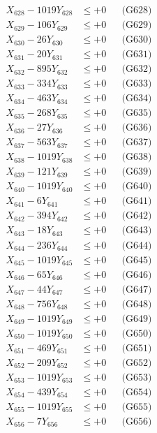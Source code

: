 \documentclass[a4paper,10pt]{article}
\begin{document}
{\begin{align}
X_{628} - 1019Y_{628} &\leq +0 && \text{(G628)} \\
X_{629} - 106Y_{629} &\leq +0 && \text{(G629)} \\
X_{630} - 26Y_{630} &\leq +0 && \text{(G630)} \\
\allowbreak
X_{631} - 20Y_{631} &\leq +0 && \text{(G631)} \\
X_{632} - 895Y_{632} &\leq +0 && \text{(G632)} \\
X_{633} - 334Y_{633} &\leq +0 && \text{(G633)} \\
X_{634} - 463Y_{634} &\leq +0 && \text{(G634)} \\
X_{635} - 268Y_{635} &\leq +0 && \text{(G635)} \\
X_{636} - 27Y_{636} &\leq +0 && \text{(G636)} \\
X_{637} - 563Y_{637} &\leq +0 && \text{(G637)} \\
X_{638} - 1019Y_{638} &\leq +0 && \text{(G638)} \\
X_{639} - 121Y_{639} &\leq +0 && \text{(G639)} \\
X_{640} - 1019Y_{640} &\leq +0 && \text{(G640)} \\
\allowbreak
X_{641} - 6Y_{641} &\leq +0 && \text{(G641)} \\
X_{642} - 394Y_{642} &\leq +0 && \text{(G642)} \\
X_{643} - 18Y_{643} &\leq +0 && \text{(G643)} \\
X_{644} - 236Y_{644} &\leq +0 && \text{(G644)} \\
X_{645} - 1019Y_{645} &\leq +0 && \text{(G645)} \\
X_{646} - 65Y_{646} &\leq +0 && \text{(G646)} \\
X_{647} - 44Y_{647} &\leq +0 && \text{(G647)} \\
X_{648} - 756Y_{648} &\leq +0 && \text{(G648)} \\
X_{649} - 1019Y_{649} &\leq +0 && \text{(G649)} \\
X_{650} - 1019Y_{650} &\leq +0 && \text{(G650)} \\
\allowbreak
X_{651} - 469Y_{651} &\leq +0 && \text{(G651)} \\
X_{652} - 209Y_{652} &\leq +0 && \text{(G652)} \\
X_{653} - 1019Y_{653} &\leq +0 && \text{(G653)} \\
X_{654} - 439Y_{654} &\leq +0 && \text{(G654)} \\
X_{655} - 1019Y_{655} &\leq +0 && \text{(G655)} \\
X_{656} - 7Y_{656} &\leq +0 && \text{(G656)} \\

\end{align}}
\end{document}
